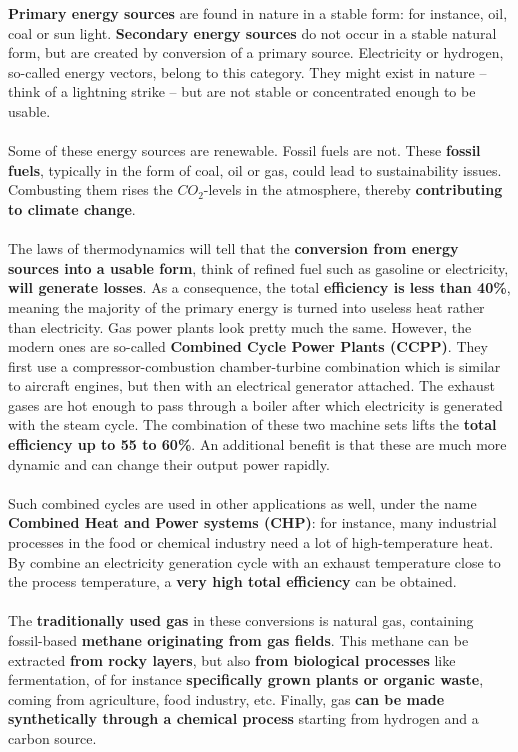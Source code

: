 \documentclass[../summary.tex]{subfiles}
\begin{document}
	\textbf{Primary energy sources} are found in nature in a stable form: for instance, oil, coal or sun light. \textbf{Secondary energy sources} do not occur in a stable natural form, but are created by conversion of a primary source. Electricity or hydrogen, so-called energy vectors, belong to this category. They might exist in nature – think of a lightning strike – but are not stable or concentrated enough to be usable.
	\\\\
	Some of these energy sources are renewable. Fossil fuels are not. These \textbf{fossil fuels}, typically in the form of coal, oil or gas, could lead to sustainability issues. Combusting them rises the $CO_2$-levels in the atmosphere, thereby \textbf{contributing to climate change}. 
	\\\\
	The laws of thermodynamics will tell that the \textbf{conversion from energy sources into a usable form}, think of refined fuel such as gasoline or electricity, \textbf{will generate losses}. As a consequence, the total \textbf{efficiency is less than 40\%}, meaning the majority of the primary energy is turned into useless heat rather than electricity. Gas power plants look pretty much the same. However, the modern ones are so-called \textbf{Combined Cycle Power Plants (CCPP)}. They first use a compressor-combustion chamber-turbine combination which is similar to aircraft engines, but then with an electrical generator attached. The exhaust gases are hot enough to pass through a boiler after which electricity is generated with the steam cycle. The combination of these two machine sets lifts the \textbf{total efficiency up to 55 to 60\%}. An additional benefit is that these are much more dynamic and can change their output power rapidly. 
	\\\\
	Such combined cycles are used in other applications as well, under the name \textbf{Combined Heat and Power systems (CHP)}: for instance, many industrial processes in the food or chemical industry need a lot of high-temperature heat. By combine an electricity generation cycle with an exhaust temperature close to the process temperature, a \textbf{very high total efficiency} can be obtained.
	\\\\
	The \textbf{traditionally used gas} in these conversions is natural gas, containing fossil-based \textbf{methane originating from gas fields}. This methane can be extracted \textbf{from rocky layers}, but also \textbf{from biological processes} like fermentation, of for instance \textbf{specifically grown plants or organic waste}, coming from agriculture, food industry, etc. Finally, gas \textbf{can be made synthetically through a chemical process} starting from hydrogen and a carbon source.
	
\end{document}
